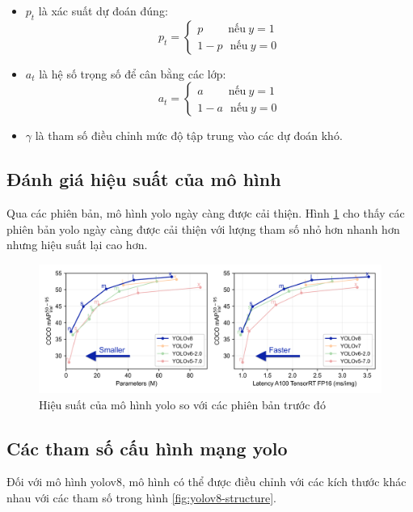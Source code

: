 \begin{itemize}
	\item $p_t$ là xác suất dự đoán đúng:
		$$
		p_t =
		\left\{ 
		\begin{array}{l}
			p\ \ \ \ \ \ \ \ \ \ \text{nếu}\ y = 1 \\
			1-p\ \ \ \text{nếu}\ y = 0
		\end{array} 
		\right.
		$$
	\item $a_t$ là hệ số trọng số để cân bằng các lớp:
		$$
		a_t =
		\left\{ 
		\begin{array}{l}
			a\ \ \ \ \ \ \ \ \ \ \text{nếu}\ y = 1 \\
			1-a\ \ \ \text{nếu}\ y = 0
		\end{array} 
		\right.
		$$	
	\item $\gamma$ là tham số điều chỉnh mức độ tập trung vào các dự đoán khó.		
\end{itemize}

\subsection{Đánh giá hiệu suất của mô hình}

Qua các phiên bản, mô hình \acrshort{yolo} ngày càng được cải thiện. Hình \ref{fig:yolov8-better} cho thấy các phiên bản \acrshort{yolo} ngày càng được cải thiện với lượng tham số nhỏ hơn nhanh hơn nhưng hiệu suất lại cao hơn.


\begin{figure}[h]
    \centering
    \includegraphics[width=0.75\linewidth]{images/yolov8-better.png}
    \caption{Hiệu suất của mô hình \acrshort{yolo} so với các phiên bản trước đó}
    \label{fig:yolov8-better}
\end{figure}


\subsection{Các tham số cấu hình mạng \acrshort{yolo}}

Đối với mô hình \acrshort{yolo}v8, mô hình có thể được điều chỉnh với các kích thước khác nhau với các tham số trong hình \ref{fig:yolov8-structure}.

